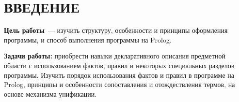 \chapter*{\hfill{}ВВЕДЕНИЕ\hfill}

\textbf{Цель работы}~--- изучить структуру, особенности и принципы оформления программы, и способ выполнения программы на Prolog.

\textbf{Задачи работы:} приобрести навыки декларативного описания предметной области с использованием фактов, правил и некоторых специальных разделов программы. Изучить порядок использования фактов и правил в программе на Prolog, принципы и особенности сопоставления и отождествления термов, на основе механизма унификации.


